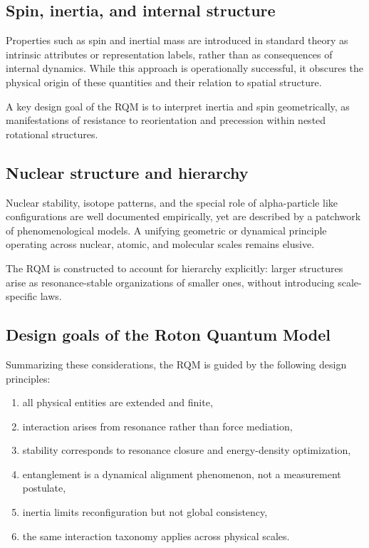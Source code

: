 \documentclass[11pt,a4paper]{article}
\begin{document}
\subsection{Spin, inertia, and internal structure}

Properties such as spin and inertial mass are introduced in standard theory as intrinsic
attributes or representation labels, rather than as consequences of internal dynamics.
While this approach is operationally successful, it obscures the physical origin of these
quantities and their relation to spatial structure.

A key design goal of the RQM is to interpret inertia and spin geometrically, as manifestations
of resistance to reorientation and precession within nested rotational structures.

\subsection{Nuclear structure and hierarchy}

Nuclear stability, isotope patterns, and the special role of alpha-particle like configurations are
well documented empirically, yet are described by a patchwork of phenomenological models.
A unifying geometric or dynamical principle operating across nuclear, atomic, and molecular
scales remains elusive.

The RQM is constructed to account for hierarchy explicitly: larger structures arise as
resonance-stable organizations of smaller ones, without introducing scale-specific laws.

\subsection{Design goals of the Roton Quantum Model}

Summarizing these considerations, the RQM is guided by the following design principles:
\begin{enumerate}
  \item all physical entities are extended and finite,
  \item interaction arises from resonance rather than force mediation,
  \item stability corresponds to resonance closure and energy-density optimization,
  \item entanglement is a dynamical alignment phenomenon, not a measurement postulate,
  \item inertia limits reconfiguration but not global consistency,
  \item the same interaction taxonomy applies across physical scales.
\end{enumerate}
\end{document}
